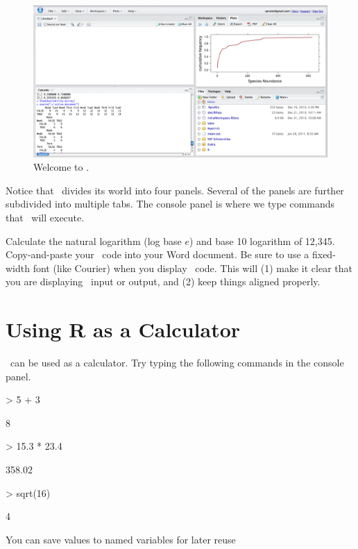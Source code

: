 \begin{figure}
\begin{center}
\includegraphics[width=.75\textwidth]{images/RStudio-bigview}
\end{center}
\caption{Welcome to \Rstudio.}
\label{fig:Rstudio-bigview}%
\end{figure}

Notice that \Rstudio\ divides its world into four panels.  Several of the panels
are further subdivided into multiple tabs.
The console panel is where we type commands that \R\ will execute. 

\begin{problem}
Calculate the natural logarithm (log base $e$) and base 10 logarithm of 12,345.
Copy-and-paste your \R\ code into your Word document.  
Be sure to use a fixed-width font (like Courier) when you display \R\ code.  This will
(1) make it clear that you are displaying \R\ input or output, and (2) keep things aligned 
properly.
\end{problem}

\pagebreak
\section{Using R as a Calculator}
\R\ can be used as a calculator.  Try typing the following commands in the console panel.

\begin{Schunk}
\begin{Sinput}
> 5 + 3
\end{Sinput}
\begin{Soutput}
[1] 8
\end{Soutput}
\begin{Sinput}
> 15.3 * 23.4
\end{Sinput}
\begin{Soutput}
[1] 358.02
\end{Soutput}
\begin{Sinput}
> sqrt(16)
\end{Sinput}
\begin{Soutput}
[1] 4
\end{Soutput}
\end{Schunk}
You can save values to named variables for later reuse

